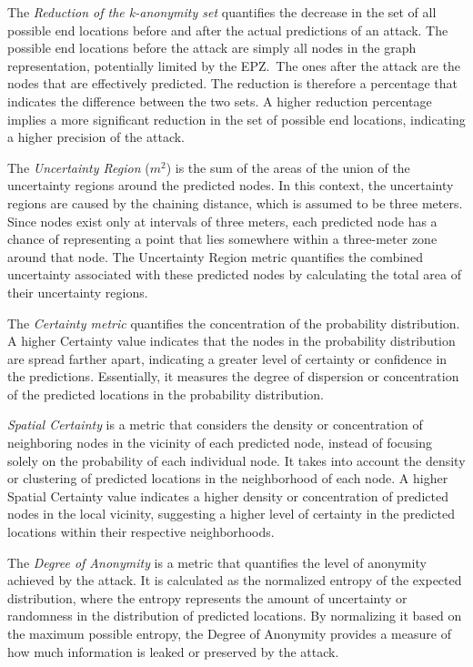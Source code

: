 \documentclass[conference]{IEEEtran}
\begin{document}
The \textit{Reduction of the k-anonymity set} quantifies the decrease in the
set of all possible end locations before and after the actual predictions of an
attack. The possible end locations before the attack are simply all nodes in
the graph representation, potentially limited by the EPZ.\ The ones after the
attack are the nodes that are effectively predicted. The reduction is therefore
a percentage that indicates the difference between the two sets. A higher
reduction percentage implies a more significant reduction in the set of
possible end locations, indicating a higher precision of the attack.

The \textit{Uncertainty Region} ($m^2$) is the sum of the areas of the union of
the uncertainty regions around the predicted nodes. In this context, the
uncertainty regions are caused by the chaining distance, which is assumed to be
three meters. Since nodes exist only at intervals of three meters, each
predicted node has a chance of representing a point that lies somewhere within
a three-meter zone around that node. The Uncertainty Region metric quantifies
the combined uncertainty associated with these predicted nodes by calculating
the total area of their uncertainty regions.

The \textit{Certainty metric} quantifies the concentration of the probability
distribution. A higher Certainty value indicates that the nodes in the
probability distribution are spread farther apart, indicating a greater level
of certainty or confidence in the predictions. Essentially, it measures the
degree of dispersion or concentration of the predicted locations in the
probability distribution.

\textit{Spatial Certainty} is a metric that considers the density or concentration of
neighboring nodes in the vicinity of each predicted node, instead of focusing
solely on the probability of each individual node. It takes into account the
density or clustering of predicted locations in the neighborhood of each node.
A higher Spatial Certainty value indicates a higher density or concentration of
predicted nodes in the local vicinity, suggesting a higher level of certainty
in the predicted locations within their respective neighborhoods.

The \textit{Degree of Anonymity} is a metric that quantifies the level of
anonymity achieved by the attack. It is calculated as the normalized entropy of
the expected distribution, where the entropy represents the amount of
uncertainty or randomness in the distribution of predicted locations. By
normalizing it based on the maximum possible entropy, the Degree of Anonymity
provides a measure of how much information is leaked or preserved by the
attack.
\end{document}
